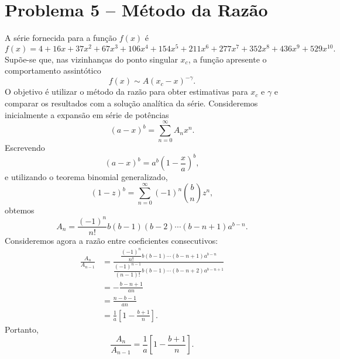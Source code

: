 \documentclass[11pt,a4paper]{article}
\begin{document}
\section*{Problema 5 -- Método da Razão}
A série fornecida para a função $f(x)$ é
%
\begin{equation}
    f(x)
    =
    4+16x+37x^2+67x^3+106x^4+154x^5
    +211x^6+277x^7+352x^8+436x^9+529x^{10}.
    \label{eq:f_series_p5}
\end{equation}
%
Supõe-se que, nas vizinhanças do ponto singular $x_c$, a função
apresente o comportamento assintótico
%
\begin{equation}
    f(x)\sim A(x_c-x)^{-\gamma}.
    \label{eq:singular_form_p5}
\end{equation}
%
O objetivo é utilizar o método da razão para obter estimativas para
$x_c$ e $\gamma$ e comparar os resultados com a solução analítica da
série. Consideremos inicialmente a expansão em série de potências
%
\begin{equation}
    (a-x)^b
    =
    \sum_{n=0}^{\infty} A_n x^n.
    \label{eq:binomial_p5}
\end{equation}
%
Escrevendo
%
\begin{equation}
    (a-x)^b
    =
    a^b
    \left(1-\frac{x}{a}\right)^b,
\end{equation}
%
e utilizando o teorema binomial generalizado,
%
\begin{equation}
    (1-z)^b
    =
    \sum_{n=0}^{\infty}
    (-1)^n
    \binom{b}{n}z^n,
\end{equation}
%
obtemos
%
\begin{equation}
    A_n
    =
    \frac{(-1)^n}{n!}
    b(b-1)(b-2)\cdots(b-n+1)
    a^{b-n}.
    \label{eq:An_p5}
\end{equation}
%
Consideremos agora a razão entre coeficientes consecutivos:
%
\begin{align}
    \frac{A_n}{A_{n-1}}
    &=
    \frac{
    \dfrac{(-1)^n}{n!}
    b(b-1)\cdots(b-n+1)a^{b-n}
    }{
    \dfrac{(-1)^{n-1}}{(n-1)!}
    b(b-1)\cdots(b-n+2)a^{b-n+1}
    }
    \nonumber\\
    &=
    -\frac{b-n+1}{an}
    \nonumber\\
    &=
    \frac{n-b-1}{an}
    \nonumber\\
    &=
    \frac{1}{a}
    \left[
        1-\frac{b+1}{n}
    \right].
\end{align}
%
Portanto,
%
\begin{equation}
    \frac{A_n}{A_{n-1}}
    =
    \frac{1}{a}
    \left[
        1-\frac{b+1}{n}
    \right].
    \label{eq:ratio_ab_p5}
\end{equation}
\end{document}
